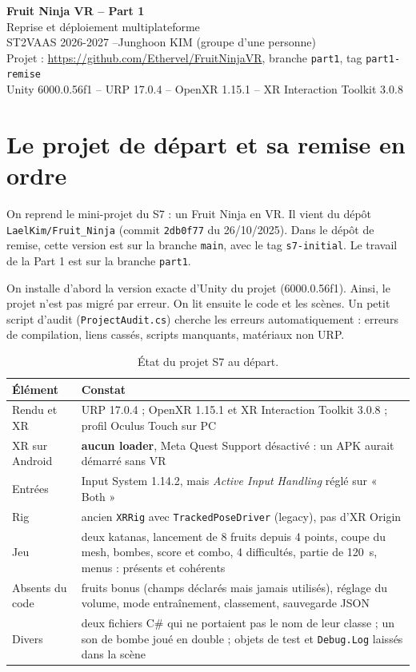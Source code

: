 \documentclass[11pt,a4paper]{article}
\newcommand{\fichier}[1]{\texttt{\small #1}}
\begin{document}
\begin{center}
  {\LARGE\bfseries Fruit Ninja VR -- Part 1}\\[4pt]
  {\Large Reprise et déploiement multiplateforme}\\[10pt]
  ST2VAAS 2026-2027 \quad--\quad Junghoon KIM (groupe d'une personne)\\[4pt]
  Projet : \url{https://github.com/Ethervel/FruitNinjaVR}, branche \texttt{part1}, tag \texttt{part1-remise}\\[2pt]
  {\small Unity 6000.0.56f1 -- URP 17.0.4 -- OpenXR 1.15.1 -- XR Interaction Toolkit 3.0.8}
\end{center}

\section{Le projet de départ et sa remise en ordre}

On reprend le mini-projet du S7 : un Fruit Ninja en VR. Il vient du dépôt \texttt{LaelKim/Fruit\_Ninja}
(commit \texttt{2db0f77} du 26/10/2025). Dans le dépôt de remise, cette version est sur la branche
\texttt{main}, avec le tag \texttt{s7-initial}. Le travail de la Part 1 est sur la branche \texttt{part1}.

On installe d'abord la version exacte d'Unity du projet (6000.0.56f1). Ainsi, le projet n'est pas
migré par erreur. On lit ensuite le code et les scènes. Un petit script d'audit
(\fichier{ProjectAudit.cs}) cherche les erreurs automatiquement : erreurs de compilation, liens cassés,
scripts manquants, matériaux non URP.

\begin{table}[!htb]
\centering\small
\caption{État du projet S7 au départ.}
\begin{tabularx}{\textwidth}{@{}P{3.6cm}L@{}}
\toprule
Élément & Constat \\
\midrule
Rendu et XR & URP 17.0.4 ; OpenXR 1.15.1 et XR Interaction Toolkit 3.0.8 ; profil Oculus Touch sur PC \\
XR sur Android & \textbf{aucun loader}, Meta Quest Support désactivé : un APK aurait démarré sans VR \\
Entrées & Input System 1.14.2, mais \emph{Active Input Handling} réglé sur « Both » \\
Rig & ancien \texttt{XRRig} avec \texttt{TrackedPoseDriver} (legacy), pas d'XR Origin \\
Jeu & deux katanas, lancement de 8 fruits depuis 4 points, coupe du mesh, bombes, score et combo,
4 difficultés, partie de 120~s, menus : présents et cohérents \\
Absents du code & fruits bonus (champs déclarés mais jamais utilisés), réglage du volume, mode
entraînement, classement, sauvegarde JSON \\
Divers & deux fichiers C\# qui ne portaient pas le nom de leur classe ; un son de bombe joué en double ;
objets de test et \texttt{Debug.Log} laissés dans la scène \\
\bottomrule
\end{tabularx}
\end{table}
\end{document}
